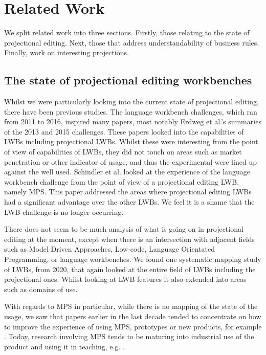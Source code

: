 \chapter{Related Work}\label{chapter:RelatedWork}
We split related work into three sections. 
Firstly, those relating to the state of projectional editing.
Next, those that address understandability of business rules.
Finally, work on interesting projections.

\section{The state of projectional editing workbenches}

Whilst we were particularly looking into the current state of projectional editing, there have been previous studies.
The language workbench challenges, which ran from 2011 to 2016, inspired many papers, most notably Erdweg et al.'s summaries of the 2013\cite{erdweg2013state} and 2015\cite{erdweg2015evaluating} challenges.
These papers looked into the capabilities of LWBs including projectional LWBs.
Whilst these were interesting from the point of view of capabilities of LWBs, they did not touch on areas such as market penetration or other indicator of usage, and thus the experimental were lined up against the well used.
Schindler et al.\cite{schindler2016language} looked at the experience of the language workbench challenge from the point of view of a projectional editing LWB, namely MPS.
This paper addressed the areas where projectional editing LWBs had a significant advantage over the other LWBs. 
We feel it is a shame that the LWB challenge is no longer occurring.

There does not seem to be much analysis of what is going on in projectional editing at the moment, except when there is an intersection with adjacent fields such as Model Driven Approaches, Low-code, Language Orientated Programming, or language workbenches.
We found one systematic mapping study of LWBs\cite{iung2020systematic}, from 2020, that again looked at the entire field of LWBs including the projectional ones.
Whilst looking at LWB features it also extended into areas such as domains of use.

With regards to MPS in particular, while there is no mapping of the state of the usage, we saw that papers earlier in the last decade tended to concentrate on how to improve the experience of using MPS, prototypes or new products, for example \cite{pavletic2013extensible,voelter2014generic,voelter2015using,voelter2010language2,voelter2013mbeddr,voelter2013requirements,voelter2014projecting,voelter2015towards,voelter2010embedded,voelter2011product,ratiu2012implementing}.
Today, research involving MPS tends to be maturing into industrial use of the product and using it in teaching, e.g. \cite{prinz2021teaching,voelterdomain_SLR, schindler2021jetbrains_SLR,simi2021learning_SLR,barash2021teaching_SLR,stotz2021migrating_SLR,ratiu2021use}.

